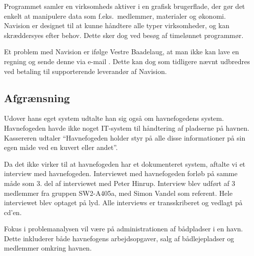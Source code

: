 Programmet samler en virksomheds aktiver i en grafisk brugerflade, der gør det enkelt at manipulere data som f.eks.\ medlemmer, materialer og økonomi. Navision er designet til at kunne håndtere alle typer virksomheder, og kan skræddersyes efter behov. Dette sker dog ved besøg af timelønnet programmør.



Et problem med Navision er ifølge Vestre Baadelaug, at man ikke kan lave en regning og sende denne via e-mail \cite{int_vb_sl}. Dette kan dog som tidligere nævnt udbredres ved betaling til supporterende leverandør af Navision.

\subsection{Afgrænsning} %
Udover hans eget system udtalte han sig også om havnefogedens system. Havnefogeden havde ikke noget IT-system til håndtering af pladserne på havnen. Kassereren udtaler \enquote{Havnefogeden holder styr på alle disse informationer på sin egen måde ved en kuvert eller andet}. 

Da det ikke virker til at havnefogeden har et dokumenteret system, aftalte vi et interview med havnefogeden. Interviewet med havnefogeden forløb på samme måde som 3. del af interviewet med Peter Hinrup. Interview blev udført af 3 medlemmer fra gruppen SW2-A405a, med Simon Vandel som referent. Hele interviewet blev optaget på lyd. Alle interviews er transskriberet og vedlagt på cd'en. 

Fokus i problemanalysen vil være på administrationen af bådpladser i en havn. Dette inkluderer både havnefogens arbejdsopgaver, salg af bådlejepladser og medlemmer omkring havnen.
